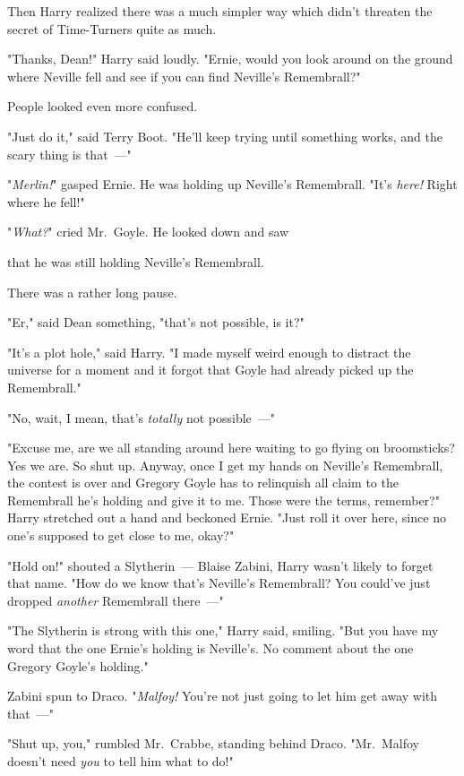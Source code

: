 Then Harry realized there was a much simpler way which didn't threaten the
secret of Time-Turners quite as much.

"Thanks, Dean!" Harry said loudly. "Ernie, would you look around on the ground
where Neville fell and see if you can find Neville's Remembrall?"

People looked even more confused.

"Just do it," said Terry Boot. "He'll keep trying until something works, and
the scary thing is that~---"

"\emph{Merlin!}" gasped Ernie. He was holding up Neville's Remembrall. "It's
\emph{here!} Right where he fell!"

"\emph{What?}" cried Mr.~Goyle. He looked down and saw{\el}

{\el} that he was still holding Neville's Remembrall.

There was a rather long pause.

"Er," said Dean something, "that's not possible, is it?"

"It's a plot hole," said Harry. "I made myself weird enough to distract the
universe for a moment and it forgot that Goyle had already picked up the
Remembrall."

"No, wait, I mean, that's \emph{totally} not possible~---"

"Excuse me, are we all standing around here waiting to go flying on
broomsticks? Yes we are. So shut up. Anyway, once I get my hands on Neville's
Remembrall, the contest is over and Gregory Goyle has to relinquish all claim
to the Remembrall he's holding and give it to me. Those were the terms,
remember?" Harry stretched out a hand and beckoned Ernie. "Just roll it over
here, since no one's supposed to get close to me, okay?"

"Hold on!" shouted a Slytherin~--- Blaise Zabini, Harry wasn't likely to forget
that name. "How do we know that's Neville's Remembrall? You could've just
dropped \emph{another} Remembrall there~---"

"The Slytherin is strong with this one," Harry said, smiling. "But you have my
word that the one Ernie's holding is Neville's. No comment about the one
Gregory Goyle's holding."

Zabini spun to Draco. "\emph{Malfoy!} You're not just going to let him get away
with that~---"

"Shut up, you," rumbled Mr.~Crabbe, standing behind Draco. "Mr.~Malfoy doesn't
need \emph{you} to tell him what to do!"

